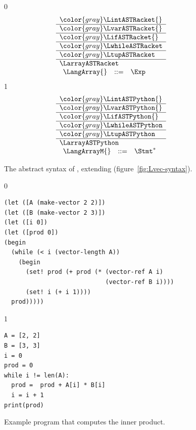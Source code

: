\documentclass[7x10]{TimesAPriori_MIT}%
\newcommand{\gray}[1]{{\color{gray} #1}}
\def\racketEd{0}
\def\pythonEd{1}
\providecommand{\BookEdition}{1}
\let\edition\BookEdition
\newcommand{\pythonColor}[0]{}
\numberwithin{theorem}{chapter}
\numberwithin{definition}{chapter}
\numberwithin{equation}{chapter}
\begin{document}
\begin{figure}[tp]
\centering
\begin{tcolorbox}[colback=white]
    \small
{\if\edition\racketEd    
\[
\begin{array}{l}
  \gray{\LintASTRacket{}} \\ \hline
  \gray{\LvarASTRacket{}} \\ \hline
  \gray{\LifASTRacket{}} \\ \hline
  \gray{\LwhileASTRacket} \\ \hline
  \gray{\LtupASTRacket} \\ \hline
  \LarrayASTRacket \\
\begin{array}{lcl}
  \LangArray{} &::=& \Exp
\end{array}
\end{array}
\]
\fi}
{\if\edition\pythonEd\pythonColor    
\[
\begin{array}{l}
  \gray{\LintASTPython{}} \\ \hline
  \gray{\LvarASTPython{}} \\ \hline
  \gray{\LifASTPython{}} \\ \hline
  \gray{\LwhileASTPython} \\ \hline
  \gray{\LtupASTPython} \\ \hline
  \LarrayASTPython \\
\begin{array}{rcl}
  \LangArrayM{} &::=& \Stmt^{*}
\end{array}
\end{array}
\]
\fi}
\end{tcolorbox}
\caption{The abstract syntax of \LangArray{}, extending \LangVec{} (figure~\ref{fig:Lvec-syntax}).}
\label{fig:Lvecof-syntax}
\end{figure}


\begin{figure}[tp]
\begin{tcolorbox}[colback=white]  
{\if\edition\racketEd
\begin{lstlisting}
(let ([A (make-vector 2 2)])
(let ([B (make-vector 2 3)])
(let ([i 0])
(let ([prod 0])
(begin
  (while (< i (vector-length A))
    (begin
      (set! prod (+ prod (* (vector-ref A i)
                            (vector-ref B i))))
      (set! i (+ i 1))))
  prod)))))
\end{lstlisting}
\fi}
{\if\edition\pythonEd\pythonColor    
\begin{lstlisting}
A = [2, 2]
B = [3, 3]
i = 0
prod = 0
while i != len(A):
  prod =  prod + A[i] * B[i]
  i = i + 1
print(prod)
\end{lstlisting}
\fi}
\end{tcolorbox}

\caption{Example program that computes the inner product.}
\label{fig:inner_product}
\end{figure}
\end{document}
